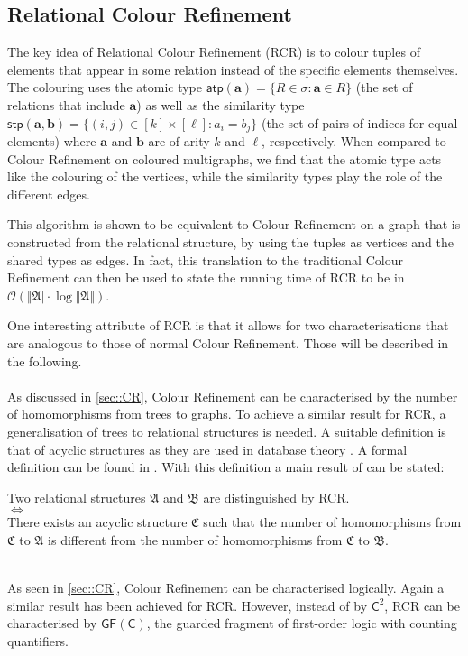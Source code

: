 \documentclass[a4paper,11pt,DIV=15]{scrartcl} %
\theoremstyle{plain}
\theoremstyle{definition}
\begin{document}
\subsection{Relational Colour Refinement}

The key idea of Relational Colour Refinement (RCR) is to colour tuples of elements that appear in some relation instead of the specific elements themselves. 
The colouring uses the atomic type $\mathsf{atp}(\mathbf{a})=\{R\in\sigma : \mathbf{a}\in R\}$ (the set of relations that include $\mathbf{a}$) as well as the similarity type $\mathsf{stp}(\mathbf{a},\mathbf{b})=\{(i,j)\in[k]\times[\ell] : a_i=b_j\}$ (the set of pairs of indices for equal elements) where $\mathbf{a}$ and $\mathbf{b}$ are of arity $k$ and $\ell$, respectively.
When compared to Colour Refinement on coloured multigraphs, we find that the atomic type acts like the colouring of the vertices, while the similarity types play the role of the different edges.

This algorithm is shown to be equivalent to Colour Refinement on a graph that is constructed from the relational structure, by using the tuples as vertices and the shared types as edges.
In fact, this translation to the traditional Colour Refinement can then be used to state the running time of RCR to be in $\mathcal O(\Vert \mathfrak A\vert\cdot \log\Vert\mathfrak A\Vert)$.

One interesting attribute of RCR is that it allows for two characterisations that are analogous to those of normal Colour Refinement. Those will be described in the following. \cite{scheidt2024color}
\\ \\
As discussed in \cref{sec::CR}, Colour Refinement can be characterised by the number of homomorphisms from trees to graphs.
To achieve a similar result for RCR, a generalisation of trees to relational structures is needed.
A suitable definition is that of acyclic structures as they are used in database theory \cite{abiteboul1995foundations}.
A formal definition can be found in \cite{scheidt2024color}.
With this definition a main result of \cite{scheidt2024color} can be stated:
\begin{center}
	Two relational structures $\mathfrak A$ and $\mathfrak B$ are distinguished by RCR.
	\\ $\Longleftrightarrow$ \\ 
	There exists an acyclic structure $\mathfrak C$ such that the number of homomorphisms from $\mathfrak C$ to $\mathfrak A$ is different from the number of homomorphisms from $\mathfrak C$ to $\mathfrak B$.
\end{center}
\hfill
\\
As seen in \cref*{sec::CR}, Colour Refinement can be characterised logically.
Again a similar result has been achieved for RCR.
However, instead of by $\mathsf C^2$, RCR can be characterised by $\mathsf{GF}(\mathsf C)$, the guarded fragment of first-order logic with counting quantifiers.
\end{document}
